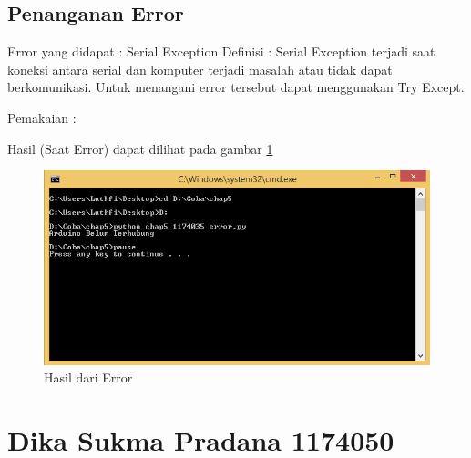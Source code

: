 	\subsection{Penanganan Error}
	Error yang didapat : Serial Exception
	Definisi : Serial Exception terjadi saat koneksi antara serial dan komputer terjadi masalah atau tidak dapat berkomunikasi. Untuk menangani error tersebut dapat menggunakan Try Except.
	
	Pemakaian : 
	
	Hasil (Saat Error) dapat dilihat pada gambar \ref{Error_1174035}
	\begin{figure}[H]
		\includegraphics[width=12cm]{figures/5/1174035/Praktek/Error.png}
		\centering
		\caption{Hasil dari Error}
		\label{Error_1174035}
	\end{figure}
	
	\section{Dika Sukma Pradana 1174050}
